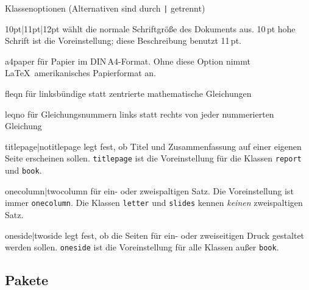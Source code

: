 \begin{table}[hbpt]
\caption[Klassenoptionen]{Klassenoptionen (Alternativen sind durch \texttt{|}
  getrennt)} \label{options}
\begin{lminipage}{11cm}
\begin{ttdescription}%
\item [10pt|11pt|12pt] wählt die normale Schriftgröße des Dokuments aus.
  10\,pt hohe Schrift ist die Voreinstellung; diese Beschreibung benutzt 11\,pt.

\item[a4paper] für Papier im DIN\,A4-Format. Ohne diese
  Option nimmt \LaTeX\ amerikanisches Papierformat an.
 
\item [fleqn] für linksbündige statt zentrierte mathematische
  Gleichungen
 
\item [leqno] für Gleichungsnummern links statt rechts von jeder
  nummerierten Gleichung
 
\item [titlepage|notitlepage] legt fest, ob Titel und Zusammenfassung
  auf einer eigenen Seite erscheinen sollen.  \texttt{titlepage} ist
  die Voreinstellung für die Klassen \texttt{report} und \texttt{book}.
 
\item [onecolumn|twocolumn] für ein- oder zweispaltigen Satz.
 Die Voreinstellung ist immer \texttt{onecolumn}.  
 Die Klassen \texttt{letter} und \texttt{slides} kennen \emph{keinen}
 zweispaltigen Satz.
 
\item [oneside|twoside] legt fest, ob die Seiten für ein- oder
  zweiseitigen  Druck gestaltet werden sollen.  
  \texttt{oneside} ist die Voreinstellung für
  alle Klassen außer \texttt{book}.
  
\end{ttdescription}
\end{lminipage}
\end{table}



\subsection{Pakete}\label{packages}
 
